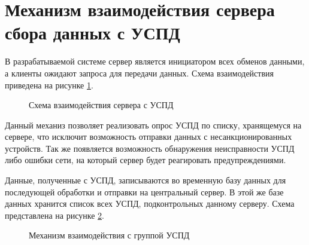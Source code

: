 \newpage
\section{Механизм взаимодействия сервера сбора данных с УСПД}
\setcounter{figure}{0}

В разрабатываемой системе сервер является инициатором всех обменов данными, а клиенты ожидают запроса для передачи данных. Схема взаимодействия приведена на рисунке \ref{scheme2:scheme2}.

\begin{figure}[h!]
 \caption{Схема взаимодействия сервера с УСПД}
 \label{scheme2:scheme2}
\end{figure}

Данный механиз позволяет реализовать опрос УСПД по списку, хранящемуся на сервере, что исключит возможность отправки данных с несанкционированных устройств. Так же появляется возможность обнаружения неисправности УСПД либо ошибки сети, на который сервер будет реагировать предупреждениями. 

Данные, полученные с УСПД, записываются во временную базу данных для последующей обработки и отправки на центральный сервер. В этой же базе данных хранится список всех УСПД, подконтрольных данному серверу. Схема представлена на рисунке \ref{scheme3:scheme3}.

\begin{figure}[h!]
 \caption{Механизм взаимодействия с группой УСПД}
 \label{scheme3:scheme3}
\end{figure}
